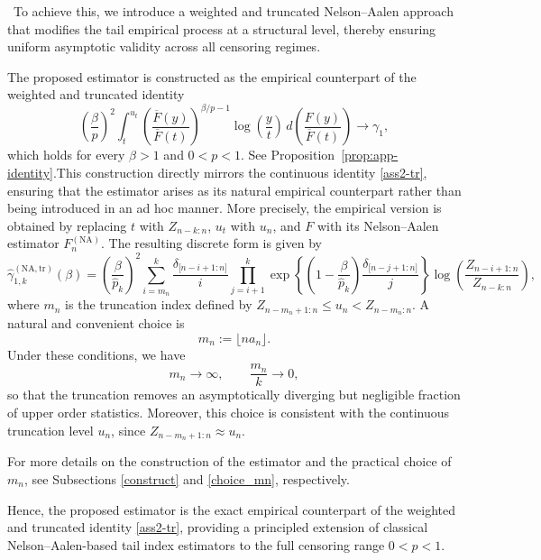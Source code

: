 \documentclass[reqno,openbib,runningheads,a4paper,12pt]{amsart}%
\begin{document}
\noindent\ To achieve this, we introduce a weighted and truncated
Nelson--Aalen approach that modifies the tail empirical process at a
structural level, thereby ensuring uniform asymptotic validity across all
censoring regimes.\smallskip

\noindent The proposed estimator is constructed as the empirical counterpart
of the weighted and truncated identity
\begin{equation}
\left(  \frac{\beta}{p}\right)  ^{2}\int_{t}^{u_{t}}\left(  \frac{\overline
{F}(y)}{\overline{F}(t)}\right)  ^{\beta/p-1}\log\!\left(  \frac{y}{t}\right)
\,d\!\left(  \frac{F(y)}{\overline{F}(t)}\right)  \longrightarrow\gamma_{1},
\label{ass2-tr}%
\end{equation}
which holds for every $\beta>1$ and $0<p<1$. See
Proposition~\ref{prop:app-identity}.\smallskip\noindent This construction
directly mirrors the continuous identity \eqref{ass2-tr}, ensuring that the
estimator arises as its natural empirical counterpart rather than being
introduced in an ad hoc manner. More precisely, the empirical version is
obtained by replacing $t$ with $Z_{n-k:n}$, $u_{t}$ with $u_{n}$, and $F$ with
its Nelson--Aalen estimator $F_{n}^{(\mathrm{NA})}$. The resulting discrete
form is given by
\[
\widehat{\gamma}_{1,k}^{(\mathrm{NA,tr})}(\beta)=\left(  \frac{\beta
}{\widehat{p}_{k}}\right)  ^{2}\sum_{i=m_{n}}^{k}\frac{\delta_{\lbrack
n-i+1:n]}}{i}\prod_{j=i+1}^{k}\exp\!\left\{  \left(  1-\frac{\beta
}{\widehat{p}_{k}}\right)  \frac{\delta_{\lbrack n-j+1:n]}}{j}\right\}
\log\!\left(  \frac{Z_{n-i+1:n}}{Z_{n-k:n}}\right)  ,
\]
where $m_{n}$ is the truncation index defined by $Z_{n-m_{n}+1:n}\leq
u_{n}<Z_{n-m_{n}:n}$. A natural and convenient choice is
\[
m_{n}:=\lfloor na_{n}\rfloor.
\]
Under these conditions, we have
\[
m_{n}\rightarrow\infty,\qquad\frac{m_{n}}{k}\rightarrow0,
\]
so that the truncation removes an asymptotically diverging but negligible
fraction of upper order statistics. Moreover, this choice is consistent with
the continuous truncation level $u_{n}$, since $Z_{n-m_{n}+1:n}\approx u_{n}%
$.\smallskip

\noindent For more details on the construction of the estimator and the
practical choice of $m_{n}$, see Subsections \ref{construct} and
\ref{choice_mn}, respectively.\smallskip

\noindent Hence, the proposed estimator is the exact empirical counterpart of
the weighted and truncated identity \eqref{ass2-tr}, providing a principled
extension of classical Nelson--Aalen-based tail index estimators to the full
censoring range $0<p<1$.\smallskip
\end{document}
